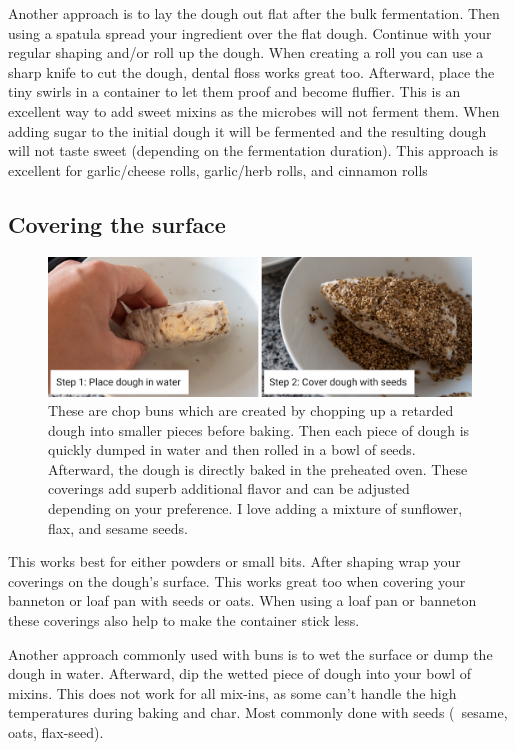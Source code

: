 Another approach is to lay the dough out flat after the bulk fermentation.
Then using a spatula spread your ingredient over the flat dough. Continue with
your regular shaping and/or roll up the dough. When creating a roll you can
use a sharp knife to cut the dough, dental floss works great too. Afterward,
place the tiny swirls in a container to let them proof and become fluffier. This is an
excellent way to add sweet mixins as the microbes will not ferment them. When
adding sugar to the initial dough it will be fermented and the resulting dough
will not taste sweet (depending on the fermentation duration). This approach
is excellent for garlic/cheese rolls, garlic/herb rolls, and cinnamon rolls

\subsection{Covering the surface}

\begin{figure}[htb!]
  \includegraphics[width=\textwidth]{surface-seeds}
  \caption[Surface seeds]{These are chop buns which are created by chopping
    up a retarded dough into smaller pieces before baking. Then each piece of
    dough is quickly dumped in water and then rolled in a bowl of seeds.
    Afterward, the dough is directly baked in the preheated oven. These
    coverings add superb additional flavor and can be adjusted depending on
    your preference. I love adding a mixture of sunflower, flax, and
    sesame seeds.}%
\end{figure}

This works best for either powders or small bits. After shaping wrap your
coverings on the dough's surface. This works great too when covering your
banneton or loaf pan with seeds or oats. When using a loaf pan or banneton
these coverings also help to make the container stick less.

Another approach commonly used with buns is to wet the surface or dump the
dough in water. Afterward, dip the wetted piece of dough into your bowl of
mixins.  This does not work for all mix-ins, as some can't handle the high temperatures
during baking and char. Most commonly done with seeds (\eg~sesame, oats, flax-seed).

